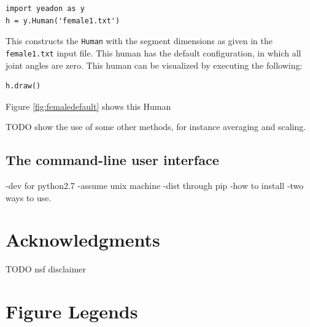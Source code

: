 \documentclass[10pt]{article}
\begin{document}
\begin{verbatim}
import yeadon as y
h = y.Human('female1.txt')
\end{verbatim}

This constructs the \verb+Human+ with the segment dimensions as given in the
\verb+female1.txt+ input file. This human has the default configuration, in
which all joint angles are zero. This human can be visualized by executing the
following:

\begin{verbatim}
h.draw()
\end{verbatim}

Figure \ref{fig:femaledefault} shows this Human

TODO show the use of some other methods, for instance averaging and scaling.

\subsection*{The command-line user interface}


-dev for python2.7
-assume unix machine
-dist through pip
-how to install
-two ways to use.



\section*{Acknowledgments}
TODO nsf disclaimer


\section*{Figure Legends}
\end{document}
